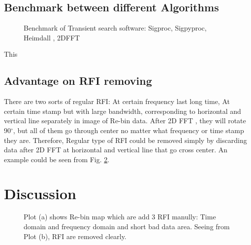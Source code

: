 \documentclass[iop]{emulateapj}
\begin{document}
\subsection{Benchmark between different Algorithms}
\begin{figure}[ht!]
\caption{Benchmark of Transient search software: Sigproc, Sigpyproc, Heimdall , 2DFFT \label{fig:benchmark}}
\end{figure} 
This 

\subsection{Advantage on RFI removing}
There are two sorts of regular RFI: At certain frequency last long time, At certain time stamp but with large bandwidth, corresponding to horizontal and vertical line separately in image of Re-bin data. After 2D FFT , they will rotate 90$^{\circ}$, but all of them go through center no matter what frequency or time stamp they are. Therefore, Regular type of RFI could be removed simply by discarding data after 2D FFT at horizontal and vertical line that go cross center.%
An example could be seen from Fig. \ref{fig:RFI remove}.

\section{Discussion}

\begin{figure}[ht!]
\centering
{}
\caption{Plot (a) shows Re-bin map which are add 3 RFI manully: Time domain and frequency domain and short bad data area. Seeing from Plot (b), RFI are removed clearly.  \label{fig:RFI remove}}
\end{figure}


	

 
\end{document}
